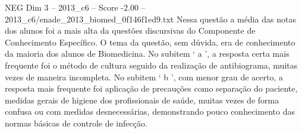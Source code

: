 \begin{textsample}{NEG Dim 3 – 2013\_c6 – Score -2.00 – 2013\_c6/enade\_2013\_biomed\_0f146f1ed9.txt}
Nessa questão a média das notas dos alunos foi a mais alta da questões discursivas do Componente de Conhecimento Específico.
O tema da questão, sem dúvida, era de conhecimento da maioria dos alunos de Biomedicina.
No subitem ‘ a ’, a resposta certa mais frequente foi o método de cultura seguido da realização de antibiograma, muitas vezes de maneira incompleta.
No subitem ‘ b ’, com menor grau de acerto, a resposta mais frequente foi aplicação de precauções como separação do paciente, medidas gerais de higiene dos profissionais de saúde, muitas vezes de forma confusa ou com medidas desnecessárias, demonstrando pouco conhecimento das normas básicas de controle de infecção.

\end{textsample}
